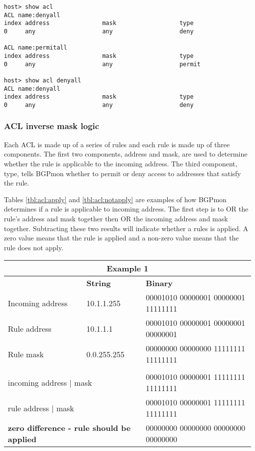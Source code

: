 \begin{Verbatim}[frame=single]
host> show acl
ACL name:denyall
index address               mask                  type 
0     any                   any                   deny    

ACL name:permitall
index address               mask                  type 
0     any                   any                   permit  

host> show acl denyall
ACL name:denyall
index address               mask                  type 
0     any                   any                   deny    

\end{Verbatim}

\subsubsection{ACL inverse mask logic}
\label{sec:configure:acl:logic}

Each ACL is made up of a series of rules and each rule is made up of three components.
The first two components, address and mask, are used to determine whether the rule is applicable to the incoming address.
The third component, type, tells BGPmon whether to permit or deny access to addresses that satisfy the rule.

Tables \ref{tbl:acl:apply} and \ref{tbl:acl:notapply} are examples of how BGPmon determines if a rule is applicable to incoming address.
The first step is to OR the rule's address and mask together then OR the incoming address and mask together.
Subtracting these two results will indicate whether a rules is applied.
A zero value means that the rule is applied and a non-zero value means that the rule does not apply.\\

\begin{table*}[htb]
\centering
\caption{\label{tbl:acl:apply}An ACL example resulting in the application of the rule.}
\begin{tabular}{|p{90pt}|p{90pt}|p{200pt}|}
\hline
\multicolumn{3}{|c|}{\textbf{Example 1}}\\ 
\hline
 & \textbf{String} & \textbf{Binary} \\ 
\hline
Incoming address & 10.1.1.255 & 00001010 00000001 00000001 11111111 \\
\hline
Rule address & 10.1.1.1 & 00001010 00000001 00000001 00000001 \\
\hline
Rule mask & 0.0.255.255 & 00000000 00000000 11111111 11111111 \\
\hline
\multicolumn{3}{|c|}{ } \\
\hline
\multicolumn{2}{|l|}{ incoming address $\mid$ mask } & 00001010 00000001 11111111 11111111 \\
\hline
\multicolumn{2}{|l|}{ rule address $\mid$ mask } & 00001010 00000001 11111111 11111111 \\
\hline
\multicolumn{2}{|l|}{ \bf{zero difference - rule should be applied} } & 00000000 00000000 00000000 00000000 \\
\hline
\end{tabular}
\end{table*}

